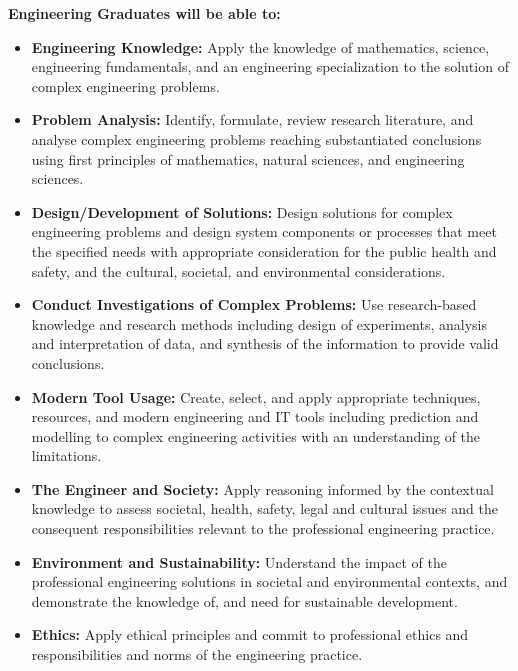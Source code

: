 \documentclass[a4paper,12pt]{report}
\begin{document}
\noindent \textbf{Engineering Graduates will be able to:}
\begin{itemize}[leftmargin=2.5cm]
    \item[\textbf{PO1.}] \textbf{Engineering Knowledge:} Apply the knowledge of mathematics, science, engineering fundamentals, and an engineering specialization to the solution of complex engineering problems.
    
    \item[\textbf{PO2.}] \textbf{Problem Analysis:} Identify, formulate, review research literature, and analyse complex engineering problems reaching substantiated conclusions using first principles of mathematics, natural sciences, and engineering sciences.
    
    \item[\textbf{PO3.}] \textbf{Design/Development of Solutions:} Design solutions for complex engineering problems and design system components or processes that meet the specified needs with appropriate consideration for the public health and safety, and the cultural, societal, and environmental considerations.
    
    \item[\textbf{PO4.}] \textbf{Conduct Investigations of Complex Problems:} Use research-based knowledge and research methods including design of experiments, analysis and interpretation of data, and synthesis of the information to provide valid conclusions.
    
    \item[\textbf{PO5.}] \textbf{Modern Tool Usage:} Create, select, and apply appropriate techniques, resources, and modern engineering and IT tools including prediction and modelling to complex engineering activities with an understanding of the limitations.
    
    \item[\textbf{PO6.}] \textbf{The Engineer and Society:} Apply reasoning informed by the contextual knowledge to assess societal, health, safety, legal and cultural issues and the consequent responsibilities relevant to the professional engineering practice.
    
    \item[\textbf{PO7.}] \textbf{Environment and Sustainability:} Understand the impact of the professional engineering solutions in societal and environmental contexts, and demonstrate the knowledge of, and need for sustainable development.
    
    \item[\textbf{PO8.}] \textbf{Ethics:} Apply ethical principles and commit to professional ethics and responsibilities and norms of the engineering practice.
    

\end{itemize}
\end{document}
